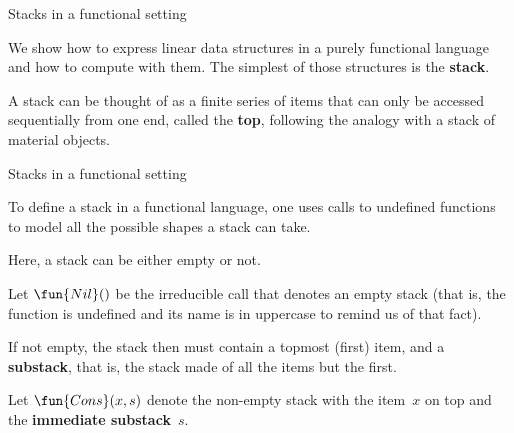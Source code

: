 %
\begin{frame}{Stacks in a functional setting}

  We show how to express linear data structures in a purely functional
  language and how to compute with them. The simplest of those
  structures is the \textbf{stack}.

  \bigskip

  A stack can be thought of as a finite series of items that can only
  be accessed sequentially from one end, called the \textbf{top},
  following the analogy with a stack of material objects.

\end{frame}

%
\begin{frame}{Stacks in a functional setting}

  To define a stack in a functional language, one uses calls to
  undefined functions to model all the possible shapes a stack can
  take.

  \bigskip

  Here, a stack can be either empty or not.

  \bigskip

  Let \(\fun{Nil}()\) be the irreducible call that denotes an empty
  stack (that is, the function  is undefined and its name is
  in uppercase to remind us of that fact).

  \bigskip

  If not empty, the stack then must contain a topmost (first) item,
  and a \textbf{substack}, that is, the stack made of all the items
  but the first.

  \bigskip

  Let \(\fun{Cons}(x,s)\) denote the non\hyp{}empty stack with the
  item~\(x\) on top and the \textbf{immediate substack}~\(s\).

\end{frame}

